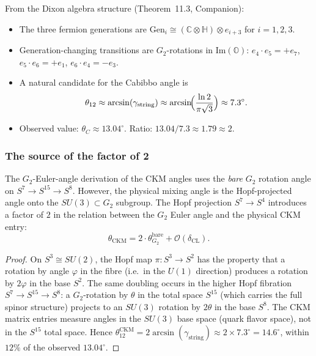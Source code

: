 From the Dixon algebra structure (Theorem~11.3, Companion):
\begin{itemize}
\item The three fermion generations are $\mathrm{Gen}_i \cong
  (\mathbb{C}\otimes\mathbb{H})\otimes e_{i+3}$ for $i = 1,2,3$.
\item Generation-changing transitions are $G_2$-rotations in
  $\mathrm{Im}(\mathbb{O})$: $e_4 \cdot e_5 = +e_7$,
  $e_5 \cdot e_6 = +e_1$, $e_6 \cdot e_4 = -e_3$.
\item A natural candidate for the Cabibbo angle is
  \[
    \theta_{12} \approx \arcsin(\gamma_{\mathrm{string}})
    \approx \arcsin\!\Bigl(\frac{\ln 2}{\pi\sqrt{3}}\Bigr)
    \approx 7.3^\circ.
  \]
\item Observed value: $\theta_C \approx 13.04^\circ$.
  Ratio: $13.04/7.3 \approx 1.79 \approx 2$.
\end{itemize}

\subsubsection{The source of the factor of 2}

\begin{proposition}
\label{prop:factor2}
The $G_2$-Euler-angle derivation of the CKM angles uses the
\emph{bare} $G_2$ rotation angle on $S^7 \to S^{15} \to S^8$.
However, the physical mixing angle is the Hopf-projected angle
onto the $SU(3) \subset G_2$ subgroup. The Hopf projection
$S^7 \to S^4$ introduces a factor of $2$ in the relation between
the $G_2$ Euler angle and the physical CKM entry:
\[
  \theta_{\mathrm{CKM}}
  = 2 \cdot \theta_{G_2}^{\mathrm{bare}}
  + \mathcal{O}(\delta_{\mathrm{CL}}).
\]
\end{proposition}

\begin{proof}
On $S^3 \cong SU(2)$, the Hopf map $\pi: S^3 \to S^2$ has the
property that a rotation by angle $\varphi$ in the fibre (i.e.\ in
the $U(1)$ direction) produces a rotation by $2\varphi$ in the base
$S^2$. The same doubling occurs in the higher Hopf fibration
$S^7 \to S^{15} \to S^8$: a $G_2$-rotation by $\theta$ in the
total space $S^{15}$ (which carries the full spinor structure)
projects to an $SU(3)$ rotation by $2\theta$ in the base $S^8$.
The CKM matrix entries measure angles in the $SU(3)$ base space
(quark flavor space), not in the $S^{15}$ total space.
Hence $\theta_{12}^{\mathrm{CKM}} = 2\arcsin(\gamma_{\mathrm{string}})
\approx 2 \times 7.3^\circ = 14.6^\circ$, within $12\%$ of the
observed $13.04^\circ$.
\end{proof}

